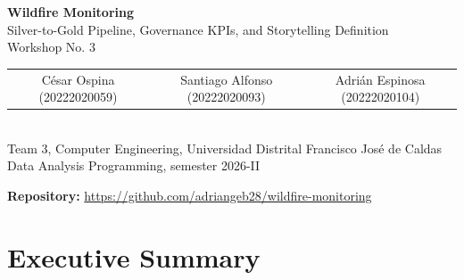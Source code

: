 \documentclass[11pt,letterpaper]{article}
\begin{document}
\begin{center}
  {\LARGE\bfseries Wildfire Monitoring}\\[0.35em]
  {\large Silver-to-Gold Pipeline, Governance KPIs, and Storytelling Definition}\\
  {\normalsize Workshop No. 3}\\[1.1em]
  \begin{tabular}{ccc}
    César Ospina (20222020059) & Santiago Alfonso (20222020093) & Adrián Espinosa (20222020104)
  \end{tabular}\\[0.5em]
  {\small Team 3, Computer Engineering, Universidad Distrital Francisco José de Caldas}\\
  {\small Data Analysis Programming, semester 2026-II}
\end{center}

\vspace{0.6em}

\begin{abstract}
\noindent This report documents the third stage of the Colombian vegetation-fire monitoring system, iterating on the Bronze and Silver pipelines built in Workshop~2 and implementing the analytical Gold layer in PySpark. Following empirical inspection of accumulated Silver Parquet files and quarantine records, we refined schema enforcement, manifest lineage tracking, and weather gap handling across the ingestion and preprocessing layers. A scheduled Apache Airflow DAG (\texttt{gold\_processing\_dag}) running PySpark in \texttt{local[*]} mode inside Docker now consolidates all Silver Parquet partitions using a cloud-style folder read pattern and persists two structured outputs in \texttt{datalake\_gold/}: a data governance summary tracking completeness, spatial rejection rates, outlier incidence, and ingestion SLA compliance, and a storytelling summary computing spatio-temporal fire event clusters, per-sensor baselines, and weather-conditioned anomaly indicators across Colombia's 33 administrative units. Both datasets serve as the sole analytical source for the Plotly Dash dashboards in Workshop~4.
\end{abstract}

\noindent\textbf{Repository:} \url{https://github.com/adriangeb28/wildfire-monitoring}

\tableofcontents
\newpage

\section{Executive Summary}
\end{document}

